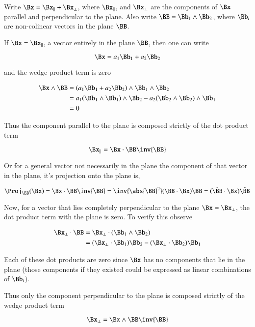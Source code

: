 Write $\Bx = \Bx_\parallel + \Bx_\perp$, where $\Bx_\parallel$, and $\Bx_\perp$ are the components of $\Bx$ parallel and perpendicular to the plane.  Also write
$\BB = \Bb_1 \wedge \Bb_2$, where $\Bb_i$ are non-colinear vectors in the plane $\BB$.

If $\Bx = \Bx_\parallel$, a vector entirely in the plane $\BB$, then one can
write

\[
\Bx = a_1\Bb_1 + a_2\Bb_2
\]

and the wedge product term is zero

\begin{align*}
\Bx \wedge \BB 
&= \left( a_1\Bb_1 + a_2\Bb_2 \right) \wedge \Bb_1 \wedge \Bb_2 \\
&= a_1 ( \Bb_1 \wedge \Bb_1 ) \wedge \Bb_2
 - a_2 ( \Bb_2 \wedge \Bb_2 ) \wedge \Bb_1 \\
&= 0
\end{align*}

Thus the component parallel to the plane is composed strictly of the dot
product term

\begin{equation}
\Bx_\parallel = \Bx \cdot \BB \inv{\BB}
\end{equation}

Or for a general vector not necessarily in the plane the component
of that vector in the plane, it's projection onto the plane is,

\[
\Proj_{\BB}(\Bx) = \Bx \cdot \BB \inv{\BB}
= \inv{\abs{\BB}^2}(\BB \cdot \Bx)\BB
= (\hat{\BB} \cdot \Bx)\hat{\BB}
\]

Now, for a vector that lies completely perpendicular to the plane $\Bx = \Bx_\perp$, the dot product term with the plane is zero.  To verify this observe

\begin{align*}
\Bx_\perp \cdot \BB 
&= \Bx_\perp \cdot (\Bb_1 \wedge \Bb_2) \\
&= (\Bx_\perp \cdot \Bb_1) \Bb_2 - (\Bx_\perp \cdot \Bb_2) \Bb_1 \\
\end{align*}

Each of these dot products are zero since $\Bx$ has no components that lie
in the plane (those components if they existed could be expressed as linear
combinations of $\Bb_i$).

Thus only the component perpendicular to the plane is composed strictly of the 
wedge product term

\begin{equation}
\Bx_\perp = \Bx \wedge \BB \inv{\BB}
\end{equation}


